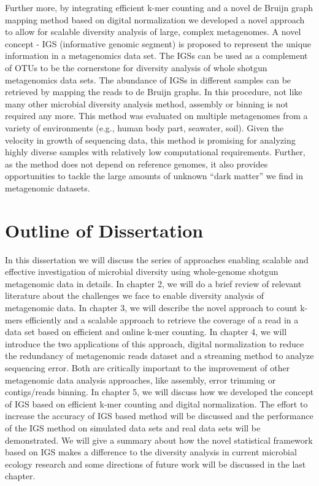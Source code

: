              Further    more, by integrating efficient k-mer counting and a
             novel de Bruijn graph mapping method based on digital
             normalization we developed a novel approach to allow for scalable
             diversity analysis of large, complex metagenomes.  A novel concept
             - IGS (informative genomic segment) is proposed to represent the
             unique information in a metagenomics data set. The IGSs can be
             used as a complement of OTUs to be the cornerstone for diversity
             analysis of whole shotgun metagenomics data sets. The abundance of
             IGSs in different samples can be retrieved by mapping the reads to
             de Bruijn graphs. In this procedure, not like many other microbial
             diversity analysis method, assembly or binning is not required any
             more. This method was evaluated on multiple metagenomes from a
             variety of environments (e.g., human body part, seawater, soil).
             Given the velocity in growth of sequencing data, this method is 
             promising for analyzing highly diverse samples with relatively low
             computational requirements. Further, as the method does not depend
             on reference genomes, it also provides opportunities to tackle the
             large amounts of unknown ``dark matter'' we 
             find in metagenomic datasets.


\section{Outline of Dissertation}
In this dissertation
we will discuss the series of approaches enabling scalable
and effective investigation of microbial diversity using whole-genome shotgun
metagenomic data in details. In chapter 2, we will do a brief review of relevant
 literature about the challenges
we face to enable diversity analysis of metagenomic data. In chapter 3, we will 
describe the novel approach to count k-mers
efficiently and a scalable approach to retrieve the coverage of a read in a 
data set based on efficient and online k-mer counting. In chapter 4, we will  introduce 
the two applications of this approach, digital normalization to reduce the redundancy of metagenomic reads
dataset and a streaming method to analyze sequencing error. Both are critically important to 
the improvement of
other metagenomic data analysis approaches, like
assembly, error trimming or contigs/reads binning. In chapter 5, we will discuss
how we developed the concept 
of IGS based on efficient k-mer counting and digital normalization.  
The effort to increase the accuracy of IGS based method 
will be discussed and the performance of the IGS method on simulated data sets and
real data sets will be demonstrated. 
We will give a summary about how the novel statistical framework based on IGS makes
 a difference to the diversity analysis in current microbial ecology research and 
 some directions of future work will be discussed in the last chapter.


